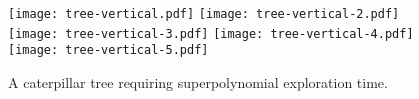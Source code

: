\begin{figure}[h]
\vspace{-0.3cm}
\centering
\hspace{-0mm}\texttt{[image: tree-vertical.pdf]}\hspace{-2mm}
\texttt{[image: tree-vertical-2.pdf]}\hspace{-5mm}
\texttt{[image: tree-vertical-3.pdf]}\hspace{-1mm}
\texttt{[image: tree-vertical-4.pdf]}\hspace{-3.5mm}
\texttt{[image: tree-vertical-5.pdf]}
\caption{
\label{fig:caterpillar}
A caterpillar tree requiring superpolynomial exploration time.}
\end{figure}



